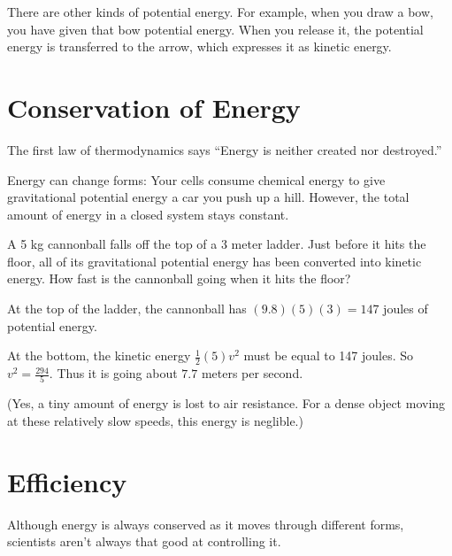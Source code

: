 There are other kinds of potential energy. For example, when you draw
a bow, you have given that bow potential energy. When you release it,
the potential energy is transferred to the arrow, which expresses it
as kinetic energy.

\section{Conservation of Energy}

The first law of thermodynamics says ``Energy is neither created nor
destroyed.''

Energy can change forms: Your cells consume chemical energy to give
gravitational potential energy a car you push up a hill. However, the total amount of
energy in a closed system stays constant.

\begin{Exercise}[title={The Energy of Falling}, label=energy_falling]
  
A 5 kg cannonball falls off the top of a 3 meter ladder. Just before
it hits the floor, all of its gravitational potential energy has been
converted into kinetic energy.  How fast is the cannonball going when
it hits the floor?

\end{Exercise}
\begin{Answer}[ref=energy_falling]

  At the top of the ladder, the cannonball has $(9.8)(5)(3) = 147$ joules of potential energy.

  At the bottom, the kinetic energy $\frac{1}{2}(5)v^2$ must be equal
  to 147 joules. So $v^2 = \frac{294}{5}$.  Thus it is going about
  $7.7$ meters per second.

  (Yes, a tiny amount of energy is lost to air resistance. For a dense
  object moving at these relatively slow speeds, this energy is
  neglible.)
  
\end{Answer}


\section{Efficiency}

Although energy is always conserved as it moves through different
forms, scientists aren't always that good at controlling it.

